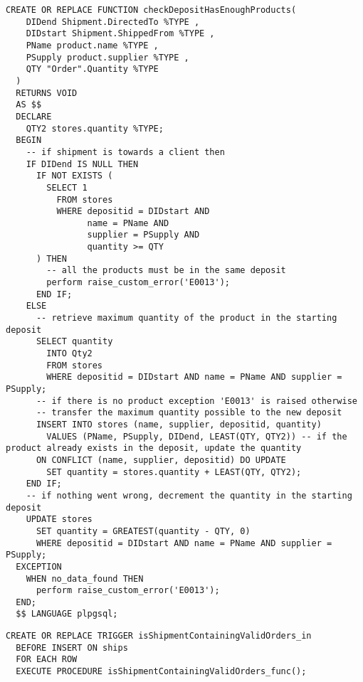\begin{lstlisting}[caption={Funzione ausiliaria \textbf{checkDepositHasEnoughProducts}}, label={checkdeposithasenoughproducts}]
  CREATE OR REPLACE FUNCTION checkDepositHasEnoughProducts(
    DIDend Shipment.DirectedTo %TYPE , 
    DIDstart Shipment.ShippedFrom %TYPE , 
    PName product.name %TYPE , 
    PSupply product.supplier %TYPE , 
    QTY "Order".Quantity %TYPE
  )
  RETURNS VOID 
  AS $$
  DECLARE
    QTY2 stores.quantity %TYPE;
  BEGIN
    -- if shipment is towards a client then
    IF DIDend IS NULL THEN
      IF NOT EXISTS (
        SELECT 1
          FROM stores
          WHERE depositid = DIDstart AND 
                name = PName AND 
                supplier = PSupply AND 
                quantity >= QTY
      ) THEN
        -- all the products must be in the same deposit
        perform raise_custom_error('E0013');
      END IF;
    ELSE
      -- retrieve maximum quantity of the product in the starting deposit
      SELECT quantity
        INTO Qty2
        FROM stores
        WHERE depositid = DIDstart AND name = PName AND supplier = PSupply;
      -- if there is no product exception 'E0013' is raised otherwise
      -- transfer the maximum quantity possible to the new deposit
      INSERT INTO stores (name, supplier, depositid, quantity)
        VALUES (PName, PSupply, DIDend, LEAST(QTY, QTY2)) -- if the product already exists in the deposit, update the quantity
      ON CONFLICT (name, supplier, depositid) DO UPDATE
        SET quantity = stores.quantity + LEAST(QTY, QTY2);
    END IF;
    -- if nothing went wrong, decrement the quantity in the starting deposit
    UPDATE stores
      SET quantity = GREATEST(quantity - QTY, 0)
      WHERE depositid = DIDstart AND name = PName AND supplier = PSupply;
  EXCEPTION
    WHEN no_data_found THEN
      perform raise_custom_error('E0013');
  END;
  $$ LANGUAGE plpgsql;
\end{lstlisting}
\newpage
\begin{lstlisting}[caption={Creazione trigger \textbf{isShipmentContainingValidOrders}}]
  CREATE OR REPLACE TRIGGER isShipmentContainingValidOrders_in
  BEFORE INSERT ON ships
  FOR EACH ROW
  EXECUTE PROCEDURE isShipmentContainingValidOrders_func();
\end{lstlisting}

